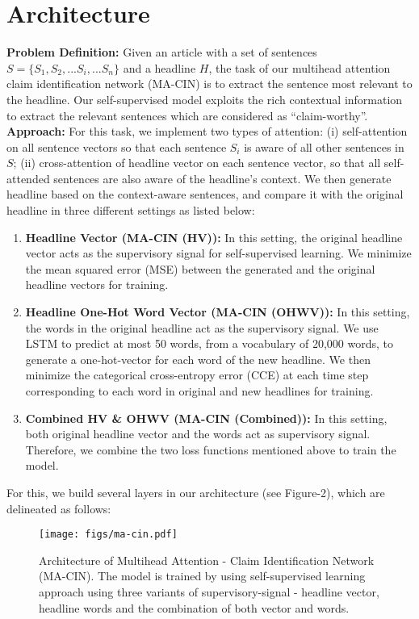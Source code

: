 \documentclass[11pt,a4paper]{article}
\begin{document}
\section{Architecture}
\label{sec:model}
\textbf{Problem Definition:} Given an article with a set of sentences $S=\{S_1, S_2,...S_i,...S_n\}$ and a headline $H$, the task of our multihead attention claim identification network (MA-CIN) is to extract the sentence most relevant to the headline. Our self-supervised model exploits the rich contextual information to extract the relevant sentences which are considered as ``claim-worthy''. \newline
\textbf{Approach:} For this task, we implement two types of attention: (i) self-attention on all sentence vectors so that each sentence $S_i$ is aware of all other sentences in $S$; (ii) cross-attention of headline vector on each sentence vector, so that all self-attended sentences are also aware of the headline's context. We then generate headline based on the context-aware sentences, and compare it with the original headline in three different settings as listed below:
\begin{enumerate}[nolistsep]
\item{\textbf{Headline Vector (MA-CIN (HV)):}} In this setting, the original headline vector acts as the supervisory signal for self-supervised learning. We minimize the mean squared error (MSE) between the generated and the original headline vectors for training.
\item{\textbf{Headline One-Hot Word Vector (MA-CIN (OHWV)):}} In this setting, the words in the original headline act as the supervisory signal. We use LSTM \cite{doi:10.1162/neco.1997.9.8.1735} to predict at most 50 words, from a vocabulary of 20,000 words, to generate a one-hot-vector for each word of the new headline. We then minimize the categorical cross-entropy error (CCE) at each time step corresponding to each word in original and new headlines for training.
\item{\textbf{Combined HV \& OHWV (MA-CIN (Combined)):}} In this setting, both original headline vector and the words act as supervisory signal. Therefore, we combine the two loss functions mentioned above to train the model.
\end{enumerate}
For this, we build several layers in our architecture (see Figure-2), which are delineated as follows:
\begin{figure*}[ht]
\begin{center}
\texttt{[image: figs/ma-cin.pdf]}
\caption{\label{fig:architecture}Architecture of Multihead Attention - Claim Identification Network (MA-CIN). The model is trained by using self-supervised learning approach using three variants of supervisory-signal - headline vector, headline words and the combination of both vector and words.}
\end{center}
\end{figure*}
\end{document}
